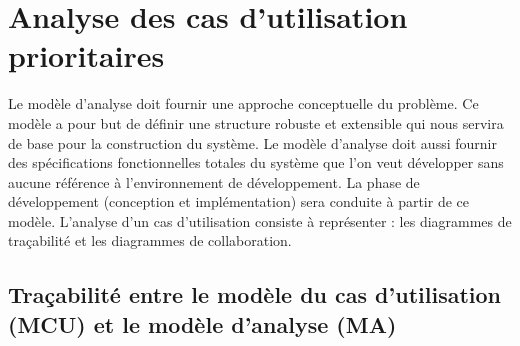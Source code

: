 \documentclass[12 pt]{report}
\begin{document}
\section{Analyse des cas d’utilisation prioritaires }
Le modèle d’analyse doit fournir une approche conceptuelle du problème. Ce modèle a
pour but de définir une structure robuste et extensible qui nous servira de base pour la
construction du système.
Le modèle d’analyse doit aussi fournir des spécifications fonctionnelles totales du système
que l’on veut développer sans aucune référence à l’environnement de développement. La
phase de développement (conception et implémentation) sera conduite à partir de ce
modèle.
L’analyse d’un cas d’utilisation consiste à représenter : les diagrammes de traçabilité et les
diagrammes de collaboration.

\subsection{Traçabilité entre le modèle du cas d’utilisation (MCU) et le modèle d’analyse (MA)}
\end{document}
